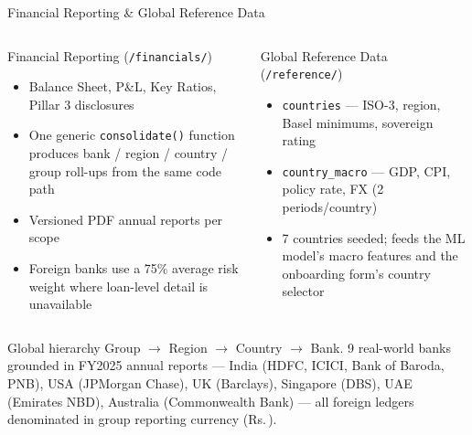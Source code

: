 \documentclass[9pt,aspectratio=169]{beamer}
\begin{document}
\begin{frame}{Financial Reporting \& Global Reference Data}
\vspace{-2pt}
\begin{columns}[T]
    \begin{block}{Financial Reporting (\texttt{/financials/})}
      \footnotesize
      \begin{itemize}\setlength\itemsep{3pt}
        \item[\small$\bullet$] Balance Sheet, P\&L, Key Ratios, Pillar 3 disclosures
        \item[\small$\bullet$] One generic \texttt{consolidate()} function produces bank / region /
              country / group roll-ups from the same code path
        \item[\small$\bullet$] Versioned PDF annual reports per scope
        \item[\small$\bullet$] Foreign banks use a 75\% average risk weight where loan-level detail
              is unavailable
      \end{itemize}
    \end{block}
    \begin{block}{Global Reference Data (\texttt{/reference/})}
      \footnotesize
      \begin{itemize}\setlength\itemsep{3pt}
        \item[\small$\bullet$] \texttt{countries} --- ISO-3, region, Basel minimums, sovereign rating
        \item[\small$\bullet$] \texttt{country\_macro} --- GDP, CPI, policy rate, FX (2 periods/country)
        \item[\small$\bullet$] 7 countries seeded; feeds the ML model's macro features and the
              onboarding form's country selector
      \end{itemize}
    \end{block}
\end{columns}
\vspace{8pt}
\begin{block}{Global hierarchy}
  \footnotesize
  Group $\to$ Region $\to$ Country $\to$ Bank. 9 real-world banks grounded in FY2025 annual
  reports --- India (HDFC, ICICI, Bank of Baroda, PNB), USA (JPMorgan Chase), UK (Barclays),
  Singapore (DBS), UAE (Emirates NBD), Australia (Commonwealth Bank) --- all foreign ledgers
  denominated in group reporting currency (Rs.\,).
\end{block}
\end{frame}
\end{document}
